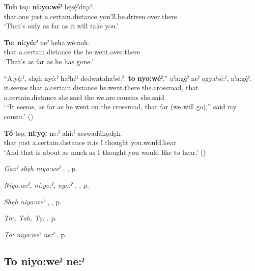 \ea
\label{ex:tpart94}
\gll \textbf{Toh} tsǫ: \textbf{ni:yo:wéˀ} hęsę́ˀdrǫ:ˀ.\\
that.one just a.certain.distance you’ll.be.driven.over.there\\
\glt ‘That’s only as far as it will take you.’
\z

\ea
\label{ex:tpart95}
\gll \textbf{To:} \textbf{ni:yó:ˀ} neˀ heha:wé:noh.\\
that a.certain.distance  the he.went.over.there\\
\glt ‘That’s as far as he has gone.’
\z

\ea
\label{ex:tpart96}
\gll “A:yę́:ˀ, shęh nyó:ˀ haˀhéˀ dedwatahaˀsé:ˀ, \textbf{to} \textbf{nyo:wéˀ},” aˀa:gę́ˀ neˀ ǫgyaˀsé:ˀ, aˀa:gę́ˀ.\\
it.seems that a.certain.distance he.went.there the.crossroad, that a.certain.distance she.said the we.are.cousins she.said\\
\glt ‘“It seems, as far as he went on the crossroad, that far (we will go),” said my cousin.’ (\cite{henry_de_2005})
\z

\ea
\label{ex:tpart97}
\gll \textbf{Tó} tsǫ: \textbf{ni:yǫ:} ne:ˀ ahi:ˀ aeswadáhǫdęh.\\
that just a.certain.distance it.is I.thought you.would.hear\\
\glt ‘And that is about as much as I thought you would like to hear.’ (\cite{mithun_how_1980})
\z

\begin{CayugaRelated}
\item \textit{Gaoˀ shęh niyo:weˀ} , , p. \pageref{p:[gaoˀ shęh niyo:weˀ]}\\
\item \textit{Niyo:weˀ, ni:yo:ˀ, nyo:ˀ} , , p. \pageref{p:[niyo:weˀ]}\\
\item \textit{Shęh niyo:weˀ} , , p. \pageref{p:[shęh niyo:weˀ]}\\
\item \textit{To:, Toh, Tǫ:} , p. \pageref{p:[to:] ‘that one’}\\
\item \textit{To: niyo:weˀ ne:ˀ} , p. \pageref{p:[to: niyo:weˀ ne:ˀ]}
\end{CayugaRelated}



\subsection*{\textbf{To niyo:weˀ ne:ˀ} } \label{p:[to: niyo:weˀ ne:ˀ]}

